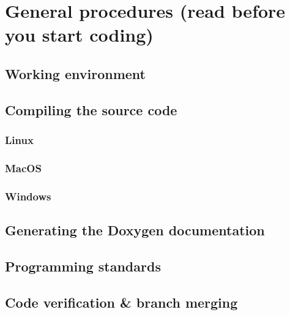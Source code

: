 \documentclass[openany]{book}
\begin{document}
\fancyhf{}
\fancyhead[LE]{\small\truncate{15cm}{\leftmark}}
\fancyhead[LO]{\small\truncate{15cm}{\rightmark}}
\fancyfoot[C]{\thepage}  
\makeatletter
\let\ps@plain\ps@fancy
\makeatother



\part{General procedures (read before you start coding)}

\chapter{Working environment \label{ch:workEnv}}



\chapter{Compiling the source code}
    \section{Linux}
    
    \section{MacOS}
    
    \section{Windows}
    
%
\chapter{Generating the Doxygen documentation}

%

\chapter{Programming standards \label{ch:standards}}

%
%

\chapter[Code verification]{Code verification \& branch merging \label{ch:mrTests}}
\end{document}
